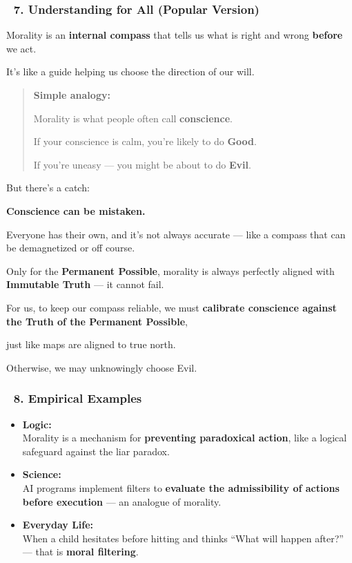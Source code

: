 \documentclass[12pt]{article}
\begin{document}
\subsubsection*{🔹 7. Understanding for All (Popular Version)}

Morality is an \textbf{internal compass} that tells us what is right and wrong \textbf{before} we act.

It’s like a guide helping us choose the direction of our will.

\begin{quote}
\textbf{Simple analogy:}

Morality is what people often call \textbf{conscience}.

If your conscience is calm, you're likely to do \textbf{Good}.

If you're uneasy — you might be about to do \textbf{Evil}.
\end{quote}

But there's a catch:

\textbf{Conscience can be mistaken.}

Everyone has their own, and it's not always accurate — like a compass that can be demagnetized or off course.

Only for the \textbf{Permanent Possible}, morality is always perfectly aligned with \textbf{Immutable Truth} — it cannot fail.

For us, to keep our compass reliable, we must \textbf{calibrate conscience against the Truth of the Permanent Possible},

just like maps are aligned to true north.

Otherwise, we may unknowingly choose Evil.

\subsubsection*{🔹 8. Empirical Examples}

\begin{itemize}
\item \textbf{Logic:} \\
Morality is a mechanism for \textbf{preventing paradoxical action}, like a logical safeguard against the liar paradox.

\item \textbf{Science:} \\
AI programs implement filters to \textbf{evaluate the admissibility of actions before execution} — an analogue of morality.

\item \textbf{Everyday Life:} \\
When a child hesitates before hitting and thinks ``What will happen after?'' — that is \textbf{moral filtering}.
\end{itemize}
\end{document}
